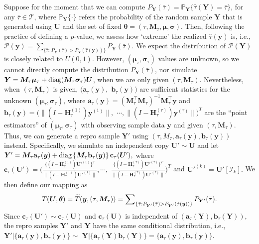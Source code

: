 \documentclass[12pt]{article}
\theoremstyle{shortspace}
\def\*#1{\bm{#1}}
\def\btheta{\mathop{\theta\kern-.45em\hbox{$\theta$}}\nolimits}
\def\P{\mathbb P}
\def\A{\mathbf a}
\def\B{\mathbf b}
\def\C{\mathbf c}
\newcommand{\diag}{\hbox{diag}}
\begin{document}
Suppose for the moment that we can compute $P_{{\*Y} }(\bar \tau) = \P_{{\*Y} }\{\hat\tau({\*Y} ) = \bar \tau\}$, 
for any $\bar \tau \in {\mathcal T}$, where $\P_{{\*Y} }\{\cdot\}$ 
refers the probability of the random sample $\*Y$ that is generated using $\*U$ and the set of fixed $\*\theta = (\tau, {\*M_\tau}, \*\mu, \*\sigma)$. 
Then, following the practice of defining a $p$-value, we assess how `extreme'  the realized $\hat\tau({\*y} )$ is, 
i.e., 
${\mathcal P}(\*y ) =  \sum\nolimits_{\{\bar \tau: \, P_{{\*Y} }(\bar \tau) > P_{{\*Y} }(\hat \tau(\*y )) \}} P_{{\*Y} }(\bar \tau).$
We expect the distribution of ${\mathcal P}(\*Y )$ is closely related to $U(0,1)$. However, 
$(\*\mu_\tau, \*\sigma_\tau)$ values are unknown, so we cannot directly compute the distribution $P_{{\*Y} }(\bar \tau)$, nor simulate $\*Y  =  \*M_{\tau} \*\mu_\tau + \diag(\*M_\tau  {\*\sigma_\tau}) \*U$, when we are only given $(\tau, \*M_\tau)$. 
 Nevertheless, when $(\tau, \*M_\tau)$ is given, $\big(\A_{\tau}(\*y ), $ $\B_{\tau}(\*y )\big)$ are sufficient statistics 
 for the unknown $(\*\mu_\tau, \*\sigma_\tau)$, where $\A_{\tau}(\*y ) = 
(\*M_{\tau}^\top \*M_{\tau})^{-1}\*M_{\tau}^\top\*y $ and
 $\B_{\tau}(\*y ) = \big(\|(I - \*H_{\tau}^{(1)})\*y^{ (1)}\|, $ $\cdots, \|(I - \*H_{\tau}^{(\tau)})\*y^{ (\tau)}\|\big)^T$
are the ``point estimators'' of $(\*\mu_\tau, \*\sigma_\tau)$ with observing sample data $\*y $ and given $(\tau, \*M_\tau)$. Thus, we can generate a repro sample $\*Y'$ using $(\tau, M_\tau, \A_{\tau}(\*y ), \B_{\tau}(\*y ))$ instead. Specifically, we simulate an independent copy ${\*U}' \sim \*U$
and let ${\*Y}' =  \*M_{\tau} \A_{\tau}(\*y) + \diag\left\{\*M_\tau\B_{\tau}(\*y)\right\}\C_{\tau}({\*U'}),$ where $\C_{\tau}(\*U') = \big(\frac{\{(I - \*H_{\tau}^{(1)})\*U'^{(1)}\}^T}{\|(I - \*H_{\tau}^{(1)})\*U'^{(1)}\|}, \cdots,$ $\frac{\{(I - \*H_{\tau}^{(\tau)})\*U'^{(\tau)}\}^T}{\|(I - \*H_{\tau}^{(\tau)})\*U'^{(\tau)}\|}\big)^T$ and $\*U'^{(k)} = \*U'[\mathcal I_k].$ 
We then define our mapping as 
\begin{align}
\label{eq:mix_nuc_new}
    T(\*U, \btheta) = \widetilde T(\*y, (\tau,{\*M_\tau})) =  \sum\nolimits_{\{\bar \tau: P_{{\*Y}'}(\bar \tau) > P_{{\*Y}'}(\hat \tau(\*y)) \}} P_{{\*Y}'}(\bar \tau). 
\end{align}
Since $\C_{\tau}({\*U'}) \sim \C_{\tau}(\*U)$ and $\C_{\tau}(\*U)$ is independent of $(\A_{\tau}(\*Y), \B_{\tau}(\*Y)),$ the repro samples 
${\*Y}'$ and ${\*Y}$
have the same conditional distribution, i.e.,  
${\*Y}' \big| \{\A_{\tau}(\*y),  \B_{\tau}(\*y)\} 
\sim \,\, \*Y \big| \{\A_{\tau}(\*Y) \B_{\tau}(\*Y)\}=\{\A_{\tau}(\*y),  \B_{\tau}(\*y)\}.$ 
\end{document}
